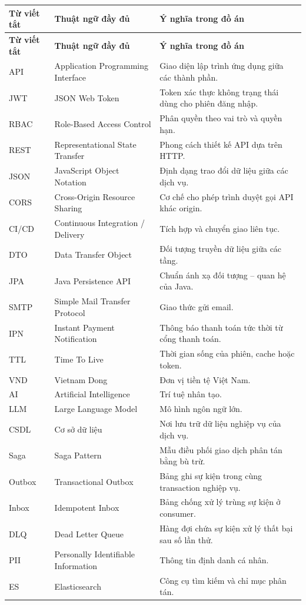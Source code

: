 \begin{spacing}{1.05}
\small
\begin{longtable}{@{}L{2.8cm}L{4.6cm}>{\raggedright\arraybackslash}p{7.0cm}@{}}
\toprule
\textbf{Từ viết tắt} & \textbf{Thuật ngữ đầy đủ} & \textbf{Ý nghĩa trong đồ án}\\
\midrule
\endfirsthead
\toprule
\textbf{Từ viết tắt} & \textbf{Thuật ngữ đầy đủ} & \textbf{Ý nghĩa trong đồ án}\\
\midrule
\endhead
\bottomrule
\endfoot
API & Application Programming Interface & Giao diện lập trình ứng dụng giữa các thành phần.\\
JWT & JSON Web Token & Token xác thực không trạng thái dùng cho phiên đăng nhập.\\
RBAC & Role-Based Access Control & Phân quyền theo vai trò và quyền hạn.\\
REST & Representational State Transfer & Phong cách thiết kế API dựa trên HTTP.\\
JSON & JavaScript Object Notation & Định dạng trao đổi dữ liệu giữa các dịch vụ.\\
CORS & Cross-Origin Resource Sharing & Cơ chế cho phép trình duyệt gọi API khác origin.\\
CI/CD & Continuous Integration / Delivery & Tích hợp và chuyển giao liên tục.\\
DTO & Data Transfer Object & Đối tượng truyền dữ liệu giữa các tầng.\\
JPA & Java Persistence API & Chuẩn ánh xạ đối tượng -- quan hệ của Java.\\
SMTP & Simple Mail Transfer Protocol & Giao thức gửi email.\\
IPN & Instant Payment Notification & Thông báo thanh toán tức thời từ cổng thanh toán.\\
TTL & Time To Live & Thời gian sống của phiên, cache hoặc token.\\
VND & Vietnam Dong & Đơn vị tiền tệ Việt Nam.\\
AI & Artificial Intelligence & Trí tuệ nhân tạo.\\
LLM & Large Language Model & Mô hình ngôn ngữ lớn.\\
CSDL & Cơ sở dữ liệu & Nơi lưu trữ dữ liệu nghiệp vụ của dịch vụ.\\
Saga & Saga Pattern & Mẫu điều phối giao dịch phân tán bằng bù trừ.\\
Outbox & Transactional Outbox & Bảng ghi sự kiện trong cùng transaction nghiệp vụ.\\
Inbox & Idempotent Inbox & Bảng chống xử lý trùng sự kiện ở consumer.\\
DLQ & Dead Letter Queue & Hàng đợi chứa sự kiện xử lý thất bại sau số lần thử.\\
PII & Personally Identifiable Information & Thông tin định danh cá nhân.\\
ES & Elasticsearch & Công cụ tìm kiếm và chỉ mục phân tán.\\
\end{longtable}
\end{spacing}

\clearpage